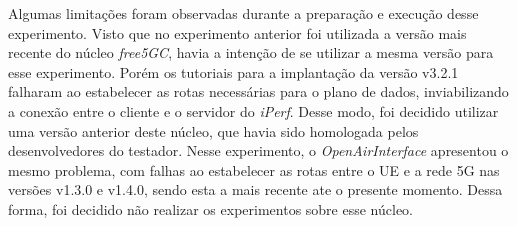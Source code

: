 Algumas limitações foram observadas durante a preparação e execução desse experimento.
Visto que no experimento anterior foi utilizada a versão mais recente do núcleo \textit{free5GC}, havia a intenção de se utilizar a mesma versão para esse experimento. Porém os tutoriais para a implantação da versão v3.2.1 falharam ao estabelecer as rotas necessárias para o plano de dados, inviabilizando a conexão entre o cliente e o servidor do \textit{iPerf}. Desse modo, foi decidido utilizar uma versão anterior deste núcleo, que havia sido homologada pelos desenvolvedores do testador.
Nesse experimento, o \textit{OpenAirInterface} apresentou o mesmo problema, com falhas ao estabelecer as rotas entre o UE e a rede 5G nas versões v1.3.0 e v1.4.0, sendo esta a mais recente ate o presente momento. Dessa forma, foi decidido não realizar os experimentos sobre esse núcleo.
